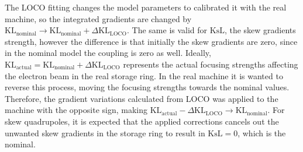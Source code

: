 The LOCO fitting changes the model parameters to calibrated it with the real machine, so the integrated gradients are changed by $\mathrm{KL}_{\mathrm{nominal}} \rightarrow \mathrm{KL}_{\mathrm{nominal}} + \Delta\mathrm{KL}_{\mathrm{LOCO}}$. The same is valid for $\mathrm{KsL}$, the skew gradients strength, however the difference is that initially the skew gradients are zero, since in the nominal model the coupling is zero as well. Ideally, $\mathrm{KL}_{\mathrm{actual}} = \mathrm{KL}_{\mathrm{nominal}} + \Delta\mathrm{KL}_{\mathrm{LOCO}}$ represents the actual focusing strengths affecting the electron beam in the real storage ring. In the real machine it is wanted to reverse this process, moving the focusing strengths towards the nominal values. Therefore, the gradient variations calculated from LOCO was applied to the machine with the opposite sign, making $\mathrm{KL}_{\mathrm{actual}} - \Delta\mathrm{KL}_{\mathrm{LOCO}} \rightarrow \mathrm{KL}_{\mathrm{nominal}}$. For skew quadrupoles, it is expected that the applied corrections cancels out the unwanted skew gradients in the storage ring to result in $\mathrm{KsL} = 0$, which is the nominal.

